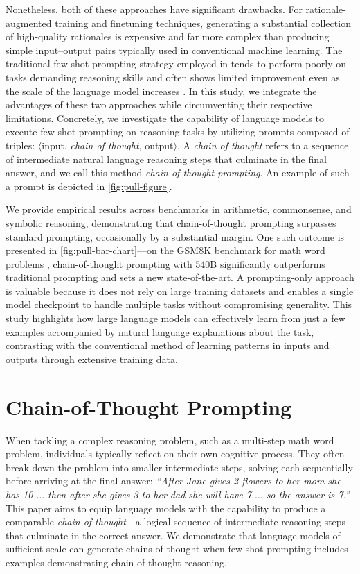 Nonetheless, both of these approaches have significant drawbacks. For rationale-augmented training and finetuning techniques, generating a substantial collection of high-quality rationales is expensive and far more complex than producing simple input--output pairs typically used in conventional machine learning. The traditional few-shot prompting strategy employed in \citet{brown2020language} tends to perform poorly on tasks demanding reasoning skills and often shows limited improvement even as the scale of the language model increases \citep{rae2021scaling}. In this study, we integrate the advantages of these two approaches while circumventing their respective limitations. Concretely, we investigate the capability of language models to execute few-shot prompting on reasoning tasks by utilizing prompts composed of triples: $\langle$input, \emph{chain of thought}, output$\rangle$. A \emph{chain of thought} refers to a sequence of intermediate natural language reasoning steps that culminate in the final answer, and we call this method \textit{chain-of-thought prompting}. An example of such a prompt is depicted in \cref{fig:pull-figure}.

We provide empirical results across benchmarks in arithmetic, commonsense, and symbolic reasoning, demonstrating that chain-of-thought prompting surpasses standard prompting, occasionally by a substantial margin. One such outcome is presented in \cref{fig:pull-bar-chart}—on the GSM8K benchmark for math word problems \citep{cobbe2021training}, chain-of-thought prompting with \palm{} 540B significantly outperforms traditional prompting and sets a new state-of-the-art. A prompting-only approach is valuable because it does not rely on large training datasets and enables a single model checkpoint to handle multiple tasks without compromising generality. This study highlights how large language models can effectively learn from just a few examples accompanied by natural language explanations about the task, contrasting with the conventional method of learning patterns in inputs and outputs through extensive training data.

\section{Chain-of-Thought Prompting} When tackling a complex reasoning problem, such as a multi-step math word problem, individuals typically reflect on their own cognitive process. They often break down the problem into smaller intermediate steps, solving each sequentially before arriving at the final answer: \textit{``After Jane gives 2 flowers to her mom she has 10 $\ldots$ then after she gives 3 to her dad she will have 7 $\ldots$ so the answer is 7.''} This paper aims to equip language models with the capability to produce a comparable \textit{chain of thought}—a logical sequence of intermediate reasoning steps that culminate in the correct answer. We demonstrate that language models of sufficient scale can generate chains of thought when few-shot prompting includes examples demonstrating chain-of-thought reasoning.

